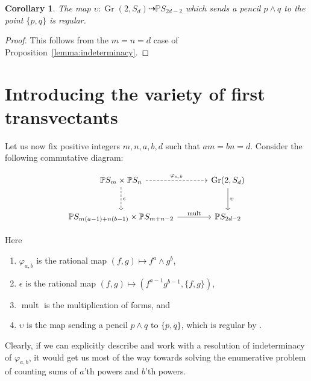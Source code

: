 \documentclass[12pt]{article}
\theoremstyle{plain}
\newtheorem{corollary}[theorem]{Corollary}
\theoremstyle{remark}
\renewcommand{\P}{\mathbb{P}}
\newcommand{\Gr}{\operatorname{Gr}}
\newcommand{\mult}{\operatorname{mult}}
\begin{document}
\begin{corollary}
    \label{corollary:wronskiregular}
    The map $\upsilon: \Gr(2,S_{d}) \dashrightarrow \P S_{2d-2}$ which sends a pencil $p \wedge q$ to the point $\{p,q\}$ is regular.
\end{corollary}

\begin{proof}
    \label{proof:wronskiregular}
    This follows from the $m = n = d$ case of Proposition~\ref{lemma:indeterminacy}.
\end{proof}

\section{Introducing the variety of first transvectants}


Let us now fix positive integers $m, n, a, b, d$ such that $a m = b n = d$.  Consider the following commutative diagram:

\begin{center}
    \begin{equation}\label{diagram:clebsch}
\begin{tikzcd}[row sep=large, column sep=large]
    \P S_{m} \times \P S_{n} \arrow[r, "\varphi_{a,b}", dashed] \arrow[d,"\epsilon", dashed] & \Gr(2,S_{d}) \arrow[d, "{\upsilon}"]\\
    \P S_{m(a-1) + n(b-1)} \times \P S_{m+n-2} \arrow[r, "\mult"] & \P S_{2d-2}
\end{tikzcd}
    \end{equation}
\end{center}

Here
\begin{enumerate}
    \item $\varphi_{a,b}$ is the rational map $(f,g) \mapsto f^a \wedge g^b$,
    \item $\epsilon$ is the rational map $(f,g) \mapsto (f^{a-1}g^{b-1},\{f,g\})$,
    \item $\mult$ is the multiplication of forms, and
    \item $\upsilon$ is the map sending a pencil $p \wedge q$ to $\{p,q\}$, which is regular by .
\end{enumerate}

Clearly, if we can explicitly describe and work with a resolution of indeterminacy of $\varphi_{a,b}$, it would get us most of the way towards solving the enumerative problem of counting sums of $a$'th powers and $b$'th powers.
\end{document}
